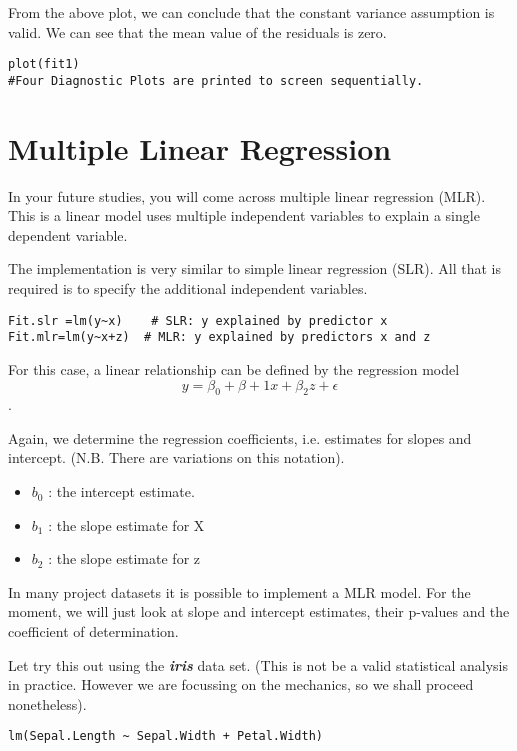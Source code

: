 \documentclass[a4paper,12pt]{article}
\begin{document}
From the above plot, we can conclude that the constant variance assumption is valid. We can see that the mean value of the residuals is zero.
\begin{framed}
\begin{verbatim}
plot(fit1)
#Four Diagnostic Plots are printed to screen sequentially.
\end{verbatim}
\end{framed}
\newpage
\section{Multiple Linear Regression}
In your future studies, you will come across multiple linear regression (MLR). This is a linear model uses multiple independent variables to explain a single dependent variable.

The implementation is very similar to simple linear regression (SLR). All that is required is to specify the additional independent variables.

\begin{framed}
\begin{verbatim}
Fit.slr =lm(y~x)  	# SLR: y explained by predictor x
Fit.mlr=lm(y~x+z)  # MLR: y explained by predictors x and z
\end{verbatim}
\end{framed}

For this case, a  linear relationship can be defined by the regression model  \[y =\beta_0 + \beta+1x + \beta_2z + \epsilon\].

Again, we determine the regression coefficients, i.e. estimates for slopes and intercept. (N.B. There are variations on this notation).

\begin{itemize}
\item	$b_0$ : the intercept estimate.
\item	$b_1$  : the slope estimate for X
\item	$b_2$  : the slope estimate for z
\end{itemize}

In many project datasets it is possible to implement a MLR model. For the moment, we will just look at slope and intercept estimates, their p-values and the coefficient of determination.

Let try this out using the \textbf{\textit{iris}} data set. (This is not be a valid statistical analysis in practice. However we are focussing on the mechanics, so we shall proceed nonetheless).
\begin{framed}
\begin{verbatim}
lm(Sepal.Length ~ Sepal.Width + Petal.Width)
\end{verbatim}
\end{framed}
\end{document}
